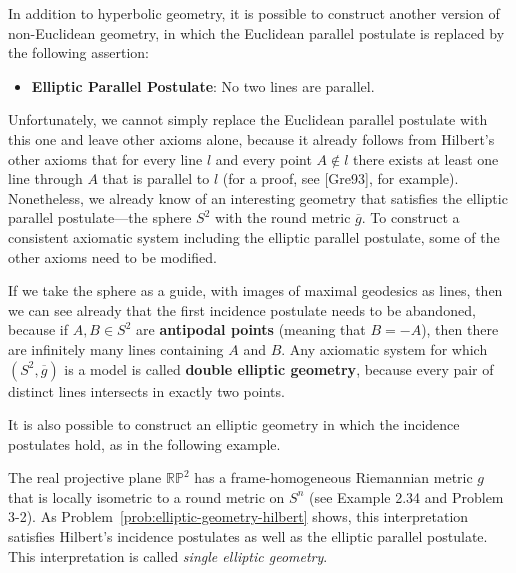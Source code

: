 In addition to hyperbolic geometry, it is possible to construct another version of non-Euclidean geometry, in which the Euclidean parallel postulate is replaced by the following assertion:

\begin{itemize}
\item \textbf{Elliptic Parallel Postulate}: No two lines are parallel.
\end{itemize}

Unfortunately, we cannot simply replace the Euclidean parallel postulate with this one and leave other axioms alone, because it already follows from Hilbert's other axioms that for every line $l$ and every point $A \notin l$ there exists at least one line through $A$ that is parallel to $l$ (for a proof, see [Gre93], for example). Nonetheless, we already know of an interesting geometry that satisfies the elliptic parallel postulate---the sphere $S^2$ with the round metric $\overline{g}$. To construct a consistent axiomatic system including the elliptic parallel postulate, some of the other axioms need to be modified.

If we take the sphere as a guide, with images of maximal geodesics as lines, then we can see already that the first incidence postulate needs to be abandoned, because if $A, B \in S^2$ are \textbf{antipodal points} (meaning that $B = -A$), then there are infinitely many lines containing $A$ and $B$. Any axiomatic system for which $(S^2, \overline{g})$ is a model is called \textbf{double elliptic geometry}, because every pair of distinct lines intersects in exactly two points.

It is also possible to construct an elliptic geometry in which the incidence postulates hold, as in the following example.

\begin{example}
\label{ex:real-projective-plane-elliptic-geometry}

The real projective plane $\mathbb{RP}^2$ has a frame-homogeneous Riemannian metric $g$ that is locally isometric to a round metric on $S^n$ (see Example 2.34 and Problem 3-2). As Problem~\ref{prob:elliptic-geometry-hilbert} shows, this interpretation satisfies Hilbert's incidence postulates as well as the elliptic parallel postulate. This interpretation is called \emph{single elliptic geometry}.
\end{example}

